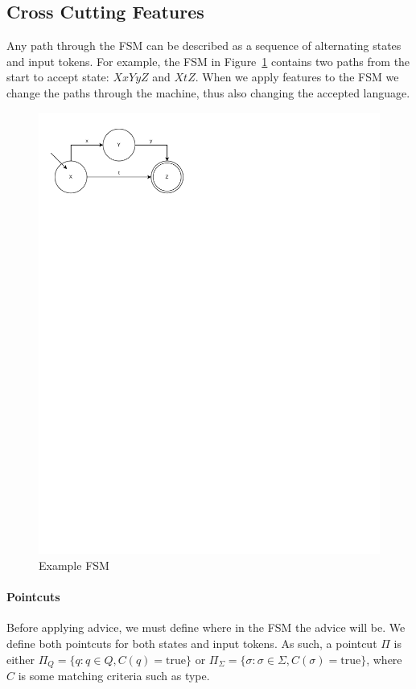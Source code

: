 \documentclass[sigplan,anonymous,review]{acmart}
\begin{document}
\subsection{Cross Cutting Features}
Any path through the FSM can be described as a sequence of alternating states and input tokens. For example, the FSM in Figure~\ref{fig:example} contains two paths from the start to accept state: $XxYyZ$ and $XtZ$. When we apply features to the FSM we change the paths through the machine, thus also changing the accepted language.

\begin{figure}
    \centering
    \includegraphics[width=0.7\linewidth]{figures/ExampleFSM.pdf}
    \caption{Example FSM}
    \label{fig:example}
\end{figure}

\paragraph{Pointcuts} Before applying advice, we must define where in the FSM the advice will be. We define both pointcuts for both states and input tokens. As such, a pointcut $\Pi$ is either $\Pi_Q = \{q : q \in Q, C(q) = \mathrm{true}\}$ or $\Pi_\Sigma = \{\sigma : \sigma \in \Sigma, C(\sigma) = \mathrm{true}\}$, where $C$ is some matching criteria such as type.
\end{document}
